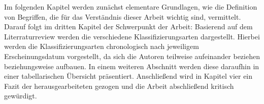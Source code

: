 Im folgenden Kapitel werden zunächst elementare Grundlagen, wie die Definition von Begriffen, die für das Verständnis dieser Arbeit wichtig sind, vermittelt.
Darauf folgt im dritten Kapitel der Schwerpunkt der Arbeit: Basierend auf dem Literraturreview werden die verschiedene Klassifizierungsarten 
dargestellt.
Hierbei werden die Klassifizierungsarten chronologisch nach jeweiligem Erscheinungsdatum vorgestellt, da
sich die Autoren teilweise aufeinander beziehen beziehungsweise aufbauen.
In einem weiteren Abschnitt werden diese daraufhin in einer tabellarischen Übersicht präsentiert.
Anschließend wird in Kapitel vier ein Fazit der herausgearbeiteten \KAS gezogen und die Arbeit abschließend kritisch gewürdigt.
